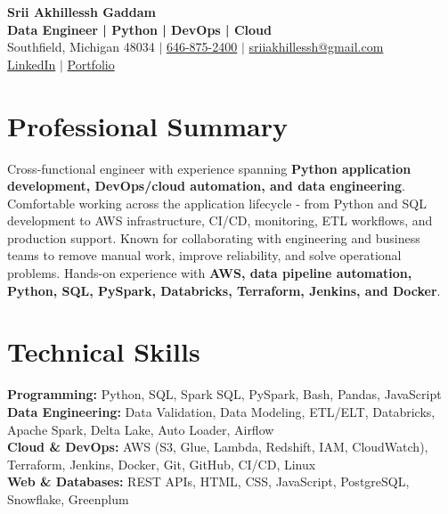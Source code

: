 \documentclass[letterpaper,10pt]{article}
\begin{document}
\fontsize{9.35pt}{10.45pt}\selectfont

\begin{center}
    {\LARGE \textbf{Srii Akhillessh Gaddam}} \\[-1pt]
    \textbf{Data Engineer | Python | DevOps | Cloud} \\[2pt]
    Southfield, Michigan 48034 $|$
    \href{tel:6468752400}{646-875-2400} $|$
    \href{mailto:sriiakhillessh@gmail.com}{sriiakhillessh@gmail.com} \\[1pt]
    \href{https://www.linkedin.com/in/srii-akhiilessh-gaddam-b48668191/}{LinkedIn} $|$
    \href{https://sriiakhillesshg.github.io/portfolio/}{Portfolio}
\end{center}
\vspace{-8pt}

\section{Professional Summary}
\small{Cross-functional engineer with experience spanning \textbf{Python application development, DevOps/cloud automation, and data engineering}. Comfortable working across the application lifecycle - from Python and SQL development to AWS infrastructure, CI/CD, monitoring, ETL workflows, and production support. Known for collaborating with engineering and business teams to remove manual work, improve reliability, and solve operational problems. Hands-on experience with \textbf{AWS, data pipeline automation, Python, SQL, PySpark, Databricks, Terraform, Jenkins, and Docker}.}

\section{Technical Skills}
\small{
\textbf{Programming:} Python, SQL, Spark SQL, PySpark, Bash, Pandas, JavaScript \\
\textbf{Data Engineering:} Data Validation, Data Modeling, ETL/ELT, Databricks, Apache Spark, Delta Lake, Auto Loader, Airflow \\
\textbf{Cloud \& DevOps:} AWS (S3, Glue, Lambda, Redshift, IAM, CloudWatch), Terraform, Jenkins, Docker, Git, GitHub, CI/CD, Linux \\
\textbf{Web \& Databases:} REST APIs, HTML, CSS, JavaScript, PostgreSQL, Snowflake, Greenplum
}

\end{document}
